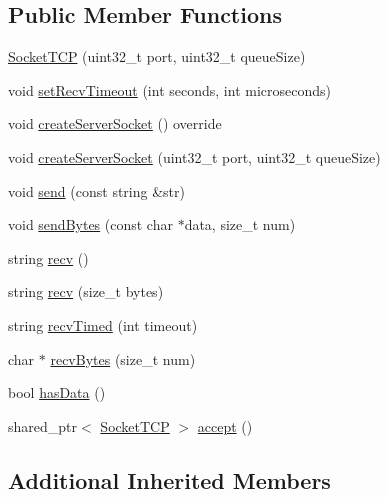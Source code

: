 \subsection*{Public Member Functions}
\begin{DoxyCompactItemize}
\item 
\hyperlink{class_socket_t_c_p_a03fa65da98287c442592f6602087703f}{Socket\-T\-C\-P} (uint32\-\_\-t port, uint32\-\_\-t queue\-Size)
\item 
void \hyperlink{class_socket_t_c_p_a473fa103469c9b83720b4f8ecfde1298}{set\-Recv\-Timeout} (int seconds, int microseconds)
\item 
void \hyperlink{class_socket_t_c_p_a4c2511b908febb309453487a5e79aaf9}{create\-Server\-Socket} () override
\item 
void \hyperlink{class_socket_t_c_p_a51b9d8a8c461f357ec72244570c69e5c}{create\-Server\-Socket} (uint32\-\_\-t port, uint32\-\_\-t queue\-Size)
\item 
void \hyperlink{class_socket_t_c_p_a853ec6fc95a21f49186829a72321cdc8}{send} (const string \&str)
\item 
void \hyperlink{class_socket_t_c_p_a1e0a19b3511099febd41579d578efd9b}{send\-Bytes} (const char $\ast$data, size\-\_\-t num)
\item 
string \hyperlink{class_socket_t_c_p_af0fcc6b415f4395f4d45db073f898319}{recv} ()
\item 
string \hyperlink{class_socket_t_c_p_a8b18cd843ab049c46cba3d6a6d2a0de8}{recv} (size\-\_\-t bytes)
\item 
string \hyperlink{class_socket_t_c_p_ad0488313f286b1583e300fc39004db97}{recv\-Timed} (int timeout)
\item 
char $\ast$ \hyperlink{class_socket_t_c_p_a429d26df00424eb1776cce33207b6b47}{recv\-Bytes} (size\-\_\-t num)
\item 
bool \hyperlink{class_socket_t_c_p_a0ef19d204316995c6e1943f6894f82c3}{has\-Data} ()
\item 
shared\-\_\-ptr$<$ \hyperlink{class_socket_t_c_p}{Socket\-T\-C\-P} $>$ \hyperlink{class_socket_t_c_p_a4a895bc95518aa10f02d476e88465809}{accept} ()
\end{DoxyCompactItemize}
\subsection*{Additional Inherited Members}


